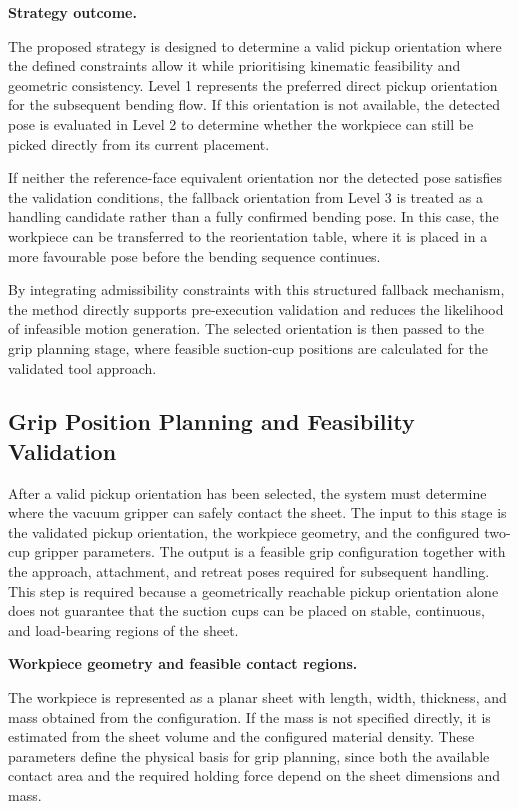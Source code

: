 \noindent\textbf{Strategy outcome.}

The proposed strategy is designed to determine a valid pickup orientation where the defined constraints allow it while prioritising kinematic feasibility and geometric consistency. Level 1 represents the preferred direct pickup orientation for the subsequent bending flow. If this orientation is not available, the detected pose is evaluated in Level 2 to determine whether the workpiece can still be picked directly from its current placement.

If neither the reference-face equivalent orientation nor the detected pose satisfies the validation conditions, the fallback orientation from Level 3 is treated as a handling candidate rather than a fully confirmed bending pose. In this case, the workpiece can be transferred to the reorientation table, where it is placed in a more favourable pose before the bending sequence continues.

By integrating admissibility constraints with this structured fallback mechanism, the method directly supports pre-execution validation and reduces the likelihood of infeasible motion generation. The selected orientation is then passed to the grip planning stage, where feasible suction-cup positions are calculated for the validated tool approach.

\subsection{Grip Position Planning and Feasibility Validation}
\label{sec:grip-planning}

After a valid pickup orientation has been selected, the system must determine where the vacuum gripper can safely contact the sheet. The input to this stage is the validated pickup orientation, the workpiece geometry, and the configured two-cup gripper parameters. The output is a feasible grip configuration together with the approach, attachment, and retreat poses required for subsequent handling. This step is required because a geometrically reachable pickup orientation alone does not guarantee that the suction cups can be placed on stable, continuous, and load-bearing regions of the sheet.

\label{subsec:sheet-geometry-holes}
\noindent\textbf{Workpiece geometry and feasible contact regions.}

The workpiece is represented as a planar sheet with length, width, thickness, and mass obtained from the configuration. If the mass is not specified directly, it is estimated from the sheet volume and the configured material density. These parameters define the physical basis for grip planning, since both the available contact area and the required holding force depend on the sheet dimensions and mass.

